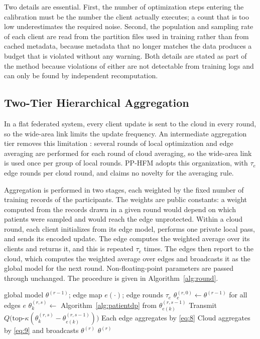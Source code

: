 Two details are essential. First, the number of optimization steps entering
the calibration must be the number the client actually executes; a count that
is too low underestimates the required noise. Second, the population and
sampling rate of each client are read from the partition files used in
training rather than from cached metadata, because metadata that no longer
matches the data produces a budget that is violated without any warning. Both
details are stated as part of the method because violations of either are not
detectable from training logs and can only be found by independent
recomputation.

\subsection{Two-Tier Hierarchical Aggregation}
\label{sec:method:agg}

In a flat federated system, every client update is sent to the cloud in every
round, so the wide-area link limits the update frequency. An intermediate
aggregation tier removes this limitation \cite{ref2, ref3}: several rounds of
local optimization and edge averaging are performed for each round of cloud
averaging, so the wide-area link is used once per group of local rounds.
PP-HFM adopts this organization, with $\tau_e$ edge rounds per cloud round, and
claims no novelty for the averaging rule.

Aggregation is performed in two stages, each weighted by the fixed number
of training records of the participants. The weights are public constants: a
weight computed from the records drawn in a given round would depend on which
patients were sampled and would reach the edge unprotected. Within a cloud round, each client
initializes from its edge model, performs one private local pass, and sends its
encoded update. The edge computes the weighted average over its clients and
returns it, and this is repeated $\tau_e$ times. The edges then report to the
cloud, which computes the weighted average over edges and broadcasts it as the
global model for the next round. Non-floating-point parameters are passed
through unchanged. The procedure is given in Algorithm~\ref{alg:round}.

\begin{algorithm}[!t]
\caption{PP-HFM cloud round $r$}
\label{alg:round}
\begin{algorithmic}[1]
\REQUIRE global model $\theta^{(r-1)}$; edge map $e(\cdot)$; edge rounds $\tau_e$
\STATE $\theta_e^{(r,0)} \leftarrow \theta^{(r-1)}$ for all edges $e$
    \STATE $\theta_k^{(r,s)} \leftarrow$ Algorithm~\ref{alg:patientdp}
           from $\theta_{e(k)}^{(r,s-1)}$
    \STATE Transmit $Q\big(\text{top-}\kappa(\theta_k^{(r,s)}-\theta_{e(k)}^{(r,s-1)})\big)$
  \ENDFOR
  \STATE Each edge aggregates by \eqref{eq:8}
\ENDFOR
\STATE Cloud aggregates by \eqref{eq:9} and broadcasts $\theta^{(r)}$
\RETURN $\theta^{(r)}$
\end{algorithmic}
\end{algorithm}

